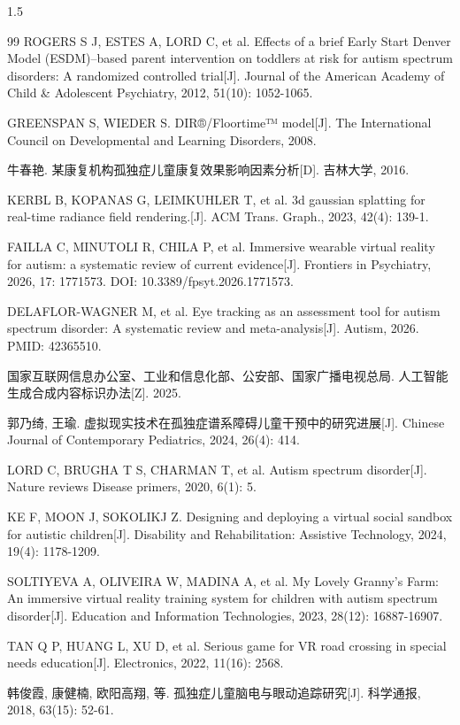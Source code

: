 \documentclass[zihao=-4]{ctexart}
\begin{document}
\begin{spacing}{1.5}
\begin{thebibliography}{99}
 ROGERS S J, ESTES A, LORD C, et al. Effects of a brief Early Start Denver Model (ESDM)--based parent intervention on toddlers at risk for autism spectrum disorders: A randomized controlled trial[J]. Journal of the American Academy of Child \& Adolescent Psychiatry, 2012, 51(10): 1052-1065.

 GREENSPAN S, WIEDER S. DIR®/Floortime™ model[J]. The International Council on Developmental and Learning Disorders, 2008.

 牛春艳. 某康复机构孤独症儿童康复效果影响因素分析[D]. 吉林大学, 2016.

 KERBL B, KOPANAS G, LEIMKUHLER T, et al. 3d gaussian splatting for real-time radiance field rendering.[J]. ACM Trans. Graph., 2023, 42(4): 139-1.

 FAILLA C, MINUTOLI R, CHILA P, et al. Immersive wearable virtual reality for autism: a systematic review of current evidence[J]. Frontiers in Psychiatry, 2026, 17: 1771573. DOI: 10.3389/fpsyt.2026.1771573.

 DELAFLOR-WAGNER M, et al. Eye tracking as an assessment tool for autism spectrum disorder: A systematic review and meta-analysis[J]. Autism, 2026. PMID: 42365510.

 国家互联网信息办公室、工业和信息化部、公安部、国家广播电视总局. 人工智能生成合成内容标识办法[Z]. 2025.

 郭乃绮, 王瑜. 虚拟现实技术在孤独症谱系障碍儿童干预中的研究进展[J]. Chinese Journal of Contemporary Pediatrics, 2024, 26(4): 414.

 LORD C, BRUGHA T S, CHARMAN T, et al. Autism spectrum disorder[J]. Nature reviews Disease primers, 2020, 6(1): 5.

 KE F, MOON J, SOKOLIKJ Z. Designing and deploying a virtual social sandbox for autistic children[J]. Disability and Rehabilitation: Assistive Technology, 2024, 19(4): 1178-1209.

 SOLTIYEVA A, OLIVEIRA W, MADINA A, et al. My Lovely Granny’s Farm: An immersive virtual reality training system for children with autism spectrum disorder[J]. Education and Information Technologies, 2023, 28(12): 16887-16907.

 TAN Q P, HUANG L, XU D, et al. Serious game for VR road crossing in special needs education[J]. Electronics, 2022, 11(16): 2568.

 韩俊霞, 康健楠, 欧阳高翔, 等. 孤独症儿童脑电与眼动追踪研究[J]. 科学通报, 2018, 63(15): 52-61.


\end{thebibliography}
\end{spacing}
\end{document}
